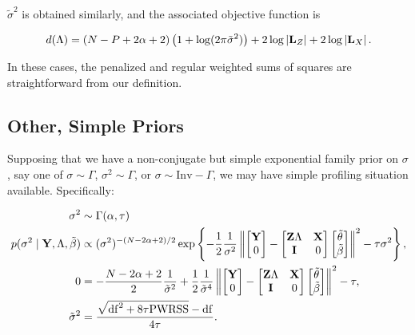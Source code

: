\documentclass[10pt]{article}
\begin{document}
$\tilde\sigma^2$ is obtained similarly, and the associated objective function is

\begin{equation*}
d(\Lambda) = (N - P + 2\alpha + 2)\left(1 + \log(2 \pi\tilde\sigma^2)\right)
+ 2 \log\left|{\bf L}_Z\right| + 2\log\left|{\bf L}_X\right|.
\end{equation*}

In these cases, the penalized and regular weighted sums of squares are
straightforward from our definition.

\subsection*{Other, Simple Priors}

Supposing that we have a non-conjugate but simple exponential family
prior on $\sigma$, say one of $\sigma \sim \Gamma$, $\sigma^2 \sim
\Gamma$, or $\sigma \sim \mathrm{Inv}-\Gamma$, we may have simple profiling
situation available. Specifically:

\begin{align*}
\sigma^2 & \sim \Gamma(\alpha, \tau) \\
p(\sigma^2 \mid {\bf Y}, \Lambda, \tilde\beta) & \propto
(\sigma^2)^{-(N -2\alpha +
  2)/2}\exp\left\{-\frac{1}{2}\frac{1}{\sigma^2}
\left\|\begin{bmatrix}{\bf Y} \\ 0 \end{bmatrix}
- \begin{bmatrix} {\bf Z}\Lambda & {\bf X} \\ {\bf I} &
  0 \end{bmatrix}
\begin{bmatrix}\tilde\theta \\ \tilde\beta \end{bmatrix}
\right\|^2-\tau\sigma^2\right\}, \\
%
0& = -\frac{N-2\alpha +
  2}{2}\frac{1}{\tilde\sigma^2}+\frac{1}{2}\frac{1}{\tilde\sigma^4}
\left\|\begin{bmatrix}{\bf Y} \\ 0 \end{bmatrix}
- \begin{bmatrix} {\bf Z}\Lambda & {\bf X} \\ {\bf I} &
  0 \end{bmatrix}
\begin{bmatrix}\tilde\theta \\ \tilde\beta \end{bmatrix}
\right\|^2 - \tau, \\
%
\tilde\sigma^2 & = \dfrac{\sqrt{\mathrm{df}^2 + 8\tau\mathrm{PWRSS}} - \mathrm{df}}{4\tau}.
\end{align*}
\end{document}
